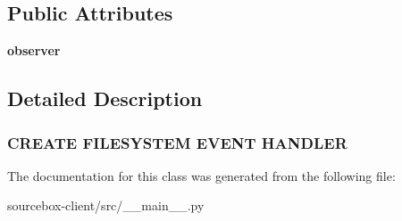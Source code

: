 \subsection*{Public Attributes}
\begin{DoxyCompactItemize}
\item 
\hypertarget{classsrc_1_1____main_____1_1_my_event_handler_a499a542c02cff1006f2842b4c873ac7c}{{\bfseries observer}}\label{classsrc_1_1____main_____1_1_my_event_handler_a499a542c02cff1006f2842b4c873ac7c}

\end{DoxyCompactItemize}


\subsection{Detailed Description}


 \subsubsection*{C\-R\-E\-A\-T\-E F\-I\-L\-E\-S\-Y\-S\-T\-E\-M E\-V\-E\-N\-T H\-A\-N\-D\-L\-E\-R }

The documentation for this class was generated from the following file\-:\begin{DoxyCompactItemize}
\item 
sourcebox-\/client/src/\-\_\-\-\_\-main\-\_\-\-\_\-.\-py\end{DoxyCompactItemize}
